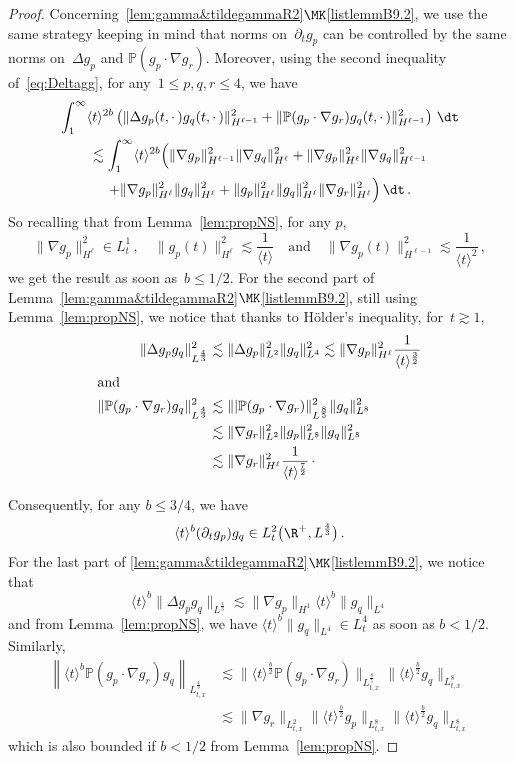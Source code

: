 \begin{proof}
Concerning~\ref{lem:gamma&tildegammaR2}$\MK$\eqref{listlemmB9.2}, we use the same strategy keeping in mind that norms on~$\partial_t g_p$ can be controlled by the same norms on~$\Delta g_p$ and ${\mathbb P}(g_p \cdot\nabla g_r)$. Moreover, using the second inequality of~\eqref{eq:Deltagg}, for any~$1 \le p,q,r \le 4$, we have
\begin{multline*}
\int_1^\infty \langle t \rangle^{2b} \left(\|\Delta g_p(t,\cdot\,) g_q(t,\cdot\,)\|^2_{H^{\ell-1} }+\|{\mathbb P}(g_p \cdot\nabla g_r) g_q(t,\cdot\,)\|^2_{H^{\ell-1} }\right) \, \dt \\
 \lesssim \int_1^\infty \langle t \rangle^{2b} \Big(\|\nabla g_p\|^2_{H^{\ell-1} } \|\nabla g_q\|^2_{H^\ell} + \|\nabla g_p\|^2_{H^\ell} \|\nabla g_q\|^2_{H^{\ell-1}}\\
+ \|\nabla g_p\|^2_{H^\ell} \|g_q\|^2_{H^\ell}
+ \|g_p\|^2_{H^\ell} \|g_q\|^2_{H^\ell} \|\nabla g_r\|^2_{H^\ell}\Big) \, \dt \,.
\end{multline*}
So recalling that from Lemma~\ref{lem:propNS}, for any $p$,
\[
\|\nabla g_p\|^2_{H^{\ell}} \in L^1_t\,, \quad \|g_p(t)\|^2_{H^\ell} \lesssim \frac1{\langle t \rangle}\quad \text{and}\quad \|\nabla g_p(t)\|^2_{H^{\ell-1} }\lesssim \frac{1}{\langle t \rangle^2} \,,
\]
we get the result as soon as~$b\le1/2$. For the second part of Lemma~\ref{lem:gamma&tildegammaR2}$\MK$\eqref{listlemmB9.2}, still using Lemma~\ref{lem:propNS}, we notice that thanks to H\"older's inequality, for~$t \gtrsim 1$,
\begin{align*}
\|\Delta g_p g_q\|^2_{L^{\frac43}} &\lesssim \|\Delta g_p \|^2_{L^2} \|g_q\|^2_{L^4} \lesssim \|\nabla g_p\|^2_{H^{\ell} } \frac{1}{{\langle t \rangle^{\frac32}}}\\
\intertext{and}
\|{\mathbb P}(g_p \cdot\nabla g_r) g_q\|^2_{L^{\frac43}}& \lesssim \||{\mathbb P}(g_p \cdot\nabla g_r) \|^2_{L^\frac85} \|g_q\|^2_{L^8}
\\
& \lesssim \|\nabla g_r\|^2_{L^2} \|g_p\|^2_{L^8} \|g_q\|^2_{L^8} \\
&\lesssim \|\nabla g_r\|^2_{H^{\ell} } \frac{1}{{\langle t \rangle^{\frac72}}}\, \cdotp
\end{align*}


Consequently, for any $b\le 3/4$, we have
\[
\langle t \rangle^b (\partial_t g_p) g_q \in L^2_t \big(\R^+,L^{\frac43}\big) \,.
\]
For the last part of \ref{lem:gamma&tildegammaR2}$\MK$\eqref{listlemmB9.2}, we notice that
\[
\langle t \rangle^b \|\Delta g_p g_q\|_{L^{\frac43}} \lesssim \|\nabla g_p\|_{H^1} \langle t \rangle^b \|g_q\|_{L^4}
\]
and from Lemma~\ref{lem:propNS}, we have $\langle t \rangle^b \|g_q\|_{L^4} \in L^4_t$ as soon as $b<1/2$. Similarly,
\begin{align*}
\left\|\langle t \rangle^b {\mathbb P}(g_p \cdot\nabla g_r) g_q\right\|_{L^{\frac43}_{t,x}} & \lesssim
\big\|\langle t \rangle^{\frac b2} {\mathbb P}(g_p \cdot\nabla g_r)\big\|_{L^\frac85_{t,x}}
\big\|\langle t \rangle^{\frac b2} g_q\big\|_{L^8_{t,x}}
\\
& \lesssim \|\nabla g_r\|_{L^2_{t,x}} \big\|\langle t \rangle^{\frac b2} g_p\big\|_{L^8_{t,x}}\big\|\langle t \rangle^{\frac b2} g_q\big\|_{L^8_{t,x}}
\end{align*}
which is also bounded if $b<1/2$ from Lemma~\ref{lem:propNS}.


\end{proof}
